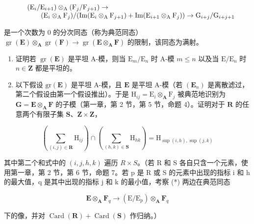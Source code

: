 \[
\begin{array}{r l}&(\mathrm{E} _ {i} / \mathrm{E} _ {i + 1}) \otimes_ {\mathrm{A}} (\mathrm{F} _ {j} / \mathrm{F} _ {j + 1}) \rightarrow\\&\qquad (\mathrm{E} _ {i} \otimes_ {\mathrm{A}} \mathrm{F} _ {j}) / (\operatorname{Im} (\mathrm{E} _ {i} \otimes_ {\mathrm{A}} \mathrm{F} _ {j + 1}) + \operatorname{Im} (\mathrm{E} _ {i + 1} \otimes_ {\mathrm{A}} \mathrm{F} _ {j})) \rightarrow \mathrm{G} _ {i + j} / \mathrm{G} _ {i + j + 1}\end{array}
\]

是一个次数为 0 的分次同态（称为典范同态）\(\operatorname{gr}(\mathbf{E}) \otimes_{\mathbf{A}} \operatorname{gr}(\mathbf{F}) \to \operatorname{gr}(\mathbf{E} \otimes_{\mathbf{A}} \mathbf{F})\) 的限制，该同态为满射。

\begin{enumerate}
\def\labelenumi{(\alph{enumi})}
\setcounter{enumi}{1}
\item
  证明若 \(\operatorname{gr}(\mathbf{E})\) 是平坦 A-模，则当 \(\mathrm{E}_m / \mathrm{E}_n\) 时 A-模 \(m \leqslant n\) 以及当 \(\mathrm{E} / \mathrm{E}_n\) 时 \(n \in \mathbf{Z}\) 都是平坦的。
\item
  以下假设 \(\mathrm{gr}(\mathbf{E})\) 是平坦 A-模，且 \(\mathbf{E}\) 是平坦 A-模（若 \((\mathbf{E}_n)\) 是离散滤过，第二个假设由第一个假设推出）。于是 \(\mathrm{H}_{ij} = \mathrm{E}_i \otimes_{\mathbf{A}} \mathrm{F}_j\) 被典范地识别为 \(\mathbf{G} = \mathbf{E} \otimes_{\mathbf{A}} \mathbf{F}\) 的子模（第一章，第 2 节，第 5 节，命题 4）。证明对于 \(\mathbf{R}\) 的任意两个有限子集 \(\mathbf{S}\)、\(\mathbf{Z} \times \mathbf{Z}\)，
\end{enumerate}

\[
\left(\sum_ {(i, j) \in \mathbf {R}} \mathrm{H} _ {i j}\right) \cap \left(\sum_ {(h, k) \in \mathbf {S}} \mathrm{H} _ {h k}\right) = \mathrm{H} _ {\sup (i, h), \sup (j, k)}\tag{*}
\]

其中第二个和式中的 \((i,j,h,k)\) 遍历 \(R \times S\)。（若 R 和 S 各自只含一个元素，使用第一章，第 2 节，第 6 节，命题 7。若 p 是 R 或 S 的元素中出现的指标 i 和 h 的最大值，q 是其中出现的指标 j 和 k 的最小值，考察 (*) 两边在典范同态

\[
\mathbf {E} \otimes_ {\mathbf {A}} \mathbf {F} _ {q} \rightarrow (\mathrm{E} / \mathrm{E} _ {p}) \otimes_ {\mathbf {A}} \mathbf {F} _ {q}
\]

下的像，并对 \(\operatorname{Card}(\mathbf{R}) + \operatorname{Card}(\mathbf{S})\) 作归纳。）


